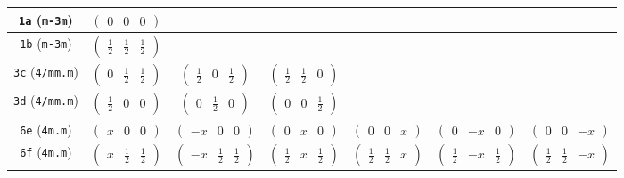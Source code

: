 \documentclass[fleqn,9pt,landscape]{jsarticle}
\begin{document}
\begin{center}
\begin{longtable}{ccccccc}
{\tt 1a} ({\tt m-3m}) & $ \begin{pmatrix} 0 & 0 & 0 \end{pmatrix} $ & $  $ & $  $ & $  $ & $  $ & $  $ \\ \hline
{\tt 1b} ({\tt m-3m}) & $ \begin{pmatrix} \frac{1}{2} & \frac{1}{2} & \frac{1}{2} \end{pmatrix} $ & $  $ & $  $ & $  $ & $  $ & $  $ \\ \hline
{\tt 3c} ({\tt 4/mm.m}) & $ \begin{pmatrix} 0 & \frac{1}{2} & \frac{1}{2} \end{pmatrix} $ & $ \begin{pmatrix} \frac{1}{2} & 0 & \frac{1}{2} \end{pmatrix} $ & $ \begin{pmatrix} \frac{1}{2} & \frac{1}{2} & 0 \end{pmatrix} $ & $  $ & $  $ & $  $ \\ \hline
{\tt 3d} ({\tt 4/mm.m}) & $ \begin{pmatrix} \frac{1}{2} & 0 & 0 \end{pmatrix} $ & $ \begin{pmatrix} 0 & \frac{1}{2} & 0 \end{pmatrix} $ & $ \begin{pmatrix} 0 & 0 & \frac{1}{2} \end{pmatrix} $ & $  $ & $  $ & $  $ \\ \hline
{\tt 6e} ({\tt 4m.m}) & $ \begin{pmatrix} x & 0 & 0 \end{pmatrix} $ & $ \begin{pmatrix} - x & 0 & 0 \end{pmatrix} $ & $ \begin{pmatrix} 0 & x & 0 \end{pmatrix} $ & $ \begin{pmatrix} 0 & 0 & x \end{pmatrix} $ & $ \begin{pmatrix} 0 & - x & 0 \end{pmatrix} $ & $ \begin{pmatrix} 0 & 0 & - x \end{pmatrix} $ \\ \hline
{\tt 6f} ({\tt 4m.m}) & $ \begin{pmatrix} x & \frac{1}{2} & \frac{1}{2} \end{pmatrix} $ & $ \begin{pmatrix} - x & \frac{1}{2} & \frac{1}{2} \end{pmatrix} $ & $ \begin{pmatrix} \frac{1}{2} & x & \frac{1}{2} \end{pmatrix} $ & $ \begin{pmatrix} \frac{1}{2} & \frac{1}{2} & x \end{pmatrix} $ & $ \begin{pmatrix} \frac{1}{2} & - x & \frac{1}{2} \end{pmatrix} $ & $ \begin{pmatrix} \frac{1}{2} & \frac{1}{2} & - x \end{pmatrix} $ \\ \hline

\end{longtable}
\end{center}
\end{document}

